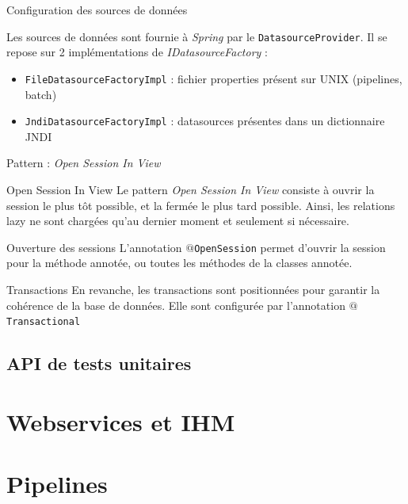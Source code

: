 \documentclass[compact]{beamer}%
\begin{document}
\begin{frame}{Configuration des sources de données}

	Les sources de données sont fournie à \emph{Spring} par le \texttt{DatasourceProvider}. Il se repose sur 2 implémentations de \emph{IDatasourceFactory} :
	\begin{itemize}
	\item \texttt{FileDatasourceFactoryImpl} : fichier properties présent sur UNIX (pipelines, batch)
	\item \texttt{JndiDatasourceFactoryImpl} : datasources présentes dans un dictionnaire JNDI
	\end{itemize}

\end{frame}

\begin{frame}{Pattern : \emph{Open Session In View}}

	\begin{block}{Open Session In View}
	Le pattern \emph{Open Session In View} consiste à ouvrir la session le plus tôt possible, et la fermée le plus tard possible. Ainsi, les relations lazy ne sont chargées qu'au dernier moment et seulement si nécessaire.
	\end{block}
	
	\pause
	\begin{block}{Ouverture des sessions}
	L'annotation \texttt{$@$OpenSession} permet d'ouvrir la session pour la méthode annotée, ou toutes les méthodes de la classes annotée.
	\end{block}
	
	\pause
	\begin{block}{Transactions}
	En revanche, les transactions sont positionnées pour garantir la cohérence de la base de données. Elle sont configurée par l'annotation \texttt{$@$Transactional}
	\end{block}

\end{frame}


\subsection{API de tests unitaires}

\section{Webservices et IHM}


\section{Pipelines}

\end{document}
